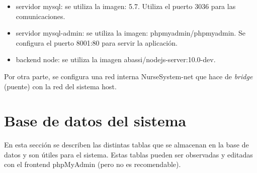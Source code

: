 \begin{itemize}
\item servidor mysql: se utiliza la imagen: 5.7. Utiliza el puerto 3036 para las comunicaciones. 
\item servidor mysql-admin: se utiliza la imagen: phpmyadmin/phpmyadmin. Se configura el puerto 8001:80 para servir la aplicación.
\item backend node: se utiliza la imagen abassi/nodejs-server:10.0-dev.
\end{itemize}

Por otra parte, se configura una red interna NurseSystem-net que hace de \textit{bridge} (puente) con la red del sistema host.



\section{Base de datos del sistema}
En esta sección se describen las distintas tablas que se almacenan en la base de datos y son útiles para el sistema. Estas tablas pueden ser observadas y editadas con el frontend phpMyAdmin (pero no es recomendable). 


